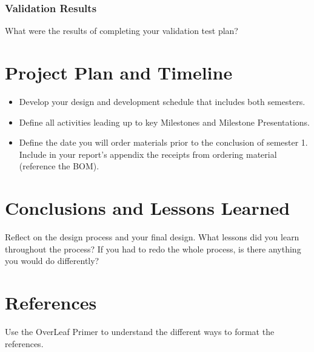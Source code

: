 \documentclass{ipfwpaper}
\begin{document}
\subsubsection{Validation Results}
What were the results of completing your validation test plan?



\clearpage
\section{Project Plan and Timeline}
\begin{itemize}
\item Develop your design and development schedule that includes both semesters. 
\item Define all activities leading up to key Milestones and Milestone Presentations.
\item Define the date you will order materials prior to the conclusion of semester 1. 
Include in your report’s appendix the receipts from ordering material (reference the BOM). 
\end{itemize}

        
\clearpage
\section*{Conclusions and Lessons Learned}

Reflect on the design process and your final design. What lessons did you learn throughout the process? If you had to redo the whole process, is there anything you would do differently? 


\clearpage
\section*{References}

Use the OverLeaf Primer to understand the different ways to format the references. 
  
\end{document}
